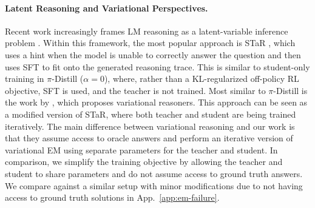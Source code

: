 \documentclass[]{servicenow} %
\begin{document}
\paragraph{Latent Reasoning and Variational Perspectives.}
Recent work increasingly frames LM reasoning as a latent-variable inference problem \citep{hu2024amortizingintractableinferencelarge, sordoni2023jointpromptoptimizationstacked, luo2025languagemodelslearnverbal, li2025startselftaughtreasonertools}.
Within this framework, the most popular approach is STaR \citep{li2025startselftaughtreasonertools}, which uses a hint when the model is unable to correctly answer the question and then uses SFT to fit onto the generated reasoning trace. This is similar to student-only training in $\pi$-Distill ($\alpha = 0$), where, rather than a KL-regularized off-policy RL objective, SFT is used, and the teacher is not trained. Most similar to $\pi$-Distill is the work by \citep{zhou2025variationalreasoninglanguagemodels}, which proposes variational reasoners. This approach can be seen as a modified version of STaR, where both teacher and student are being trained iteratively. The main difference between variational reasoning and our work is that they assume access to oracle answers and perform an iterative version of variational EM using separate parameters for the teacher and student. In comparison, we simplify the training objective by allowing the teacher and student to share parameters and do not assume access to ground truth answers. We compare against a similar setup with minor modifications due to not having access to ground truth solutions in App.~\ref{app:em-failure}. 
\end{document}
